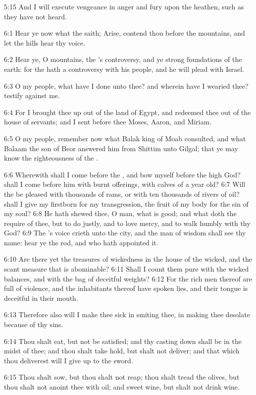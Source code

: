 5:15 And I will execute vengeance in anger and fury upon the heathen, such as they have not heard.

6:1 Hear ye now what the \LORD saith; Arise, contend thou before the mountains, and let the hills hear thy voice.

6:2 Hear ye, O mountains, the \LORD's controversy, and ye strong foundations of the earth: for the \LORD hath a controversy with his people, and he will plead with Israel.

6:3 O my people, what have I done unto thee? and wherein have I wearied thee? testify against me.

6:4 For I brought thee up out of the land of Egypt, and redeemed thee out of the house of servants; and I sent before thee Moses, Aaron, and Miriam.

6:5 O my people, remember now what Balak king of Moab consulted, and what Balaam the son of Beor answered him from Shittim unto Gilgal; that ye may know the righteousness of the \LORD.

6:6 Wherewith shall I come before the \LORD, and bow myself before the high God? shall I come before him with burnt offerings, with calves of a year old?  6:7 Will the \LORD be pleased with thousands of rams, or with ten thousands of rivers of oil? shall I give my firstborn for my transgression, the fruit of my body for the sin of my soul?  6:8 He hath shewed thee, O man, what is good; and what doth the \LORD require of thee, but to do justly, and to love mercy, and to walk humbly with thy God?  6:9 The \LORD's voice crieth unto the city, and the man of wisdom shall see thy name: hear ye the rod, and who hath appointed it.

6:10 Are there yet the treasures of wickedness in the house of the wicked, and the scant measure that is abominable?  6:11 Shall I count them pure with the wicked balances, and with the bag of deceitful weights?  6:12 For the rich men thereof are full of violence, and the inhabitants thereof have spoken lies, and their tongue is deceitful in their mouth.

6:13 Therefore also will I make thee sick in smiting thee, in making thee desolate because of thy sins.

6:14 Thou shalt eat, but not be satisfied; and thy casting down shall be in the midst of thee; and thou shalt take hold, but shalt not deliver; and that which thou deliverest will I give up to the sword.

6:15 Thou shalt sow, but thou shalt not reap; thou shalt tread the olives, but thou shalt not anoint thee with oil; and sweet wine, but shalt not drink wine.

